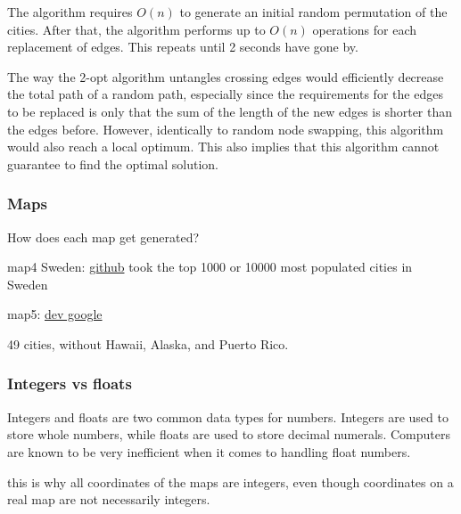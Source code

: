 \documentclass{article}
\begin{document}
\noindent
The algorithm requires $O(n)$ to generate an initial random permutation of the cities. After that, the algorithm performs up to $O(n)$ operations for each replacement of edges. This repeats until 2 seconds have gone by.

\noindent
The way the 2-opt algorithm untangles crossing edges would efficiently decrease the total path of a random path, especially since the requirements for the edges to be replaced is only that the sum of the length of the new edges is shorter than the edges before. However, identically to random node swapping, this algorithm would also reach a local optimum. This also implies that this algorithm cannot guarantee to find the optimal solution.


\subsubsection{Maps}\label{maps}
How does each map get generated?

map4 Sweden: \href{https://github.com/sphrak/svenska-stader/blob/master/src/svenska-stader.csv}{github}  took the top 1000 or 10000 most populated cities in Sweden

map5: \href{https://developers.google.com/public-data/docs/canonical/states_csv}{dev google}

49 cities, without Hawaii, Alaska, and Puerto Rico.


\subsubsection{Integers vs floats}\label{Int vs Float}
Integers and floats are two common data types for numbers. Integers are used to store whole numbers, while floats are used to store decimal numerals. Computers are known to be very inefficient when it comes to handling float numbers.

this is why all coordinates of the maps are integers, even though coordinates on a real map are not necessarily integers. 
\end{document}
